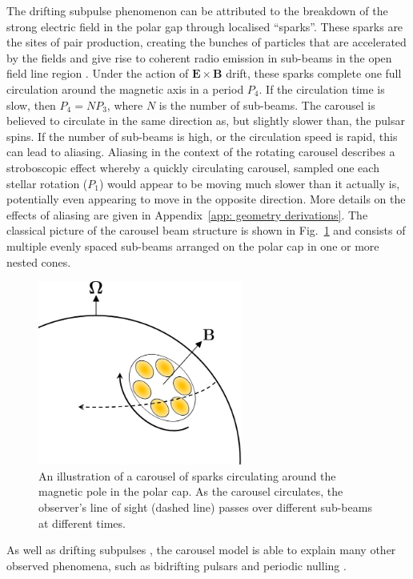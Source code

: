The drifting subpulse phenomenon can be attributed to the breakdown of the strong electric field in the polar gap through localised ``sparks''. These sparks are the sites of pair production, creating the bunches of particles that are accelerated by the fields and give rise to coherent radio emission in sub-beams in the open field line region \citep{RSxx1975, CRxx1977, Bxxx1982, FRxx1982,GSxx2000}. Under the action of $\mathbf{E} \times \mathbf{B}$ drift, these sparks complete one full circulation around the magnetic axis in a period $P_4$.  If the circulation time is slow, then $P_4 = NP_3$, where $N$ is the number of sub-beams. The carousel is believed to circulate in the same direction as, but slightly slower than, the pulsar spins. If the number of sub-beams is high, or the circulation speed is rapid, this can lead to aliasing. Aliasing in the context of the rotating carousel describes a stroboscopic effect whereby a quickly circulating carousel, sampled one each stellar rotation ($P_1$) would appear to be moving much slower than it actually is, potentially even appearing to move in the opposite direction. More details on the effects of aliasing are given in Appendix~\ref{app: geometry derivations}. The classical picture of the carousel beam structure is shown in Fig.~\ref{fig: intro - carousel schematic} and consists of multiple evenly spaced sub-beams arranged on the polar cap in one or more nested cones.
\begin{figure}
	\centering
	\includegraphics[width=0.6\textwidth]{Figures/Introduction/carousel_schematic}
    \caption[Drifting subpulses and the definitions of $P_2$ and $P_3$]{An illustration of a carousel of sparks circulating around the magnetic pole in the polar cap. As the carousel circulates, the observer's line of sight (dashed line) passes over different sub-beams at different times.}
    \label{fig: intro - carousel schematic} 
\end{figure}
As well as drifting subpulses \citep[e.g.][]{GSxx2000,GMxx2001,WESx2006,WSEx2007}, the carousel model is able to explain many other observed phenomena, such as bidrifting pulsars \citep{QLZ+2004, Wxxx2016, WWxx2017, SLxx2017, SLWM2020} and periodic nulling \citep{HRxx2007, HRxx2009, RWxx2008}.


